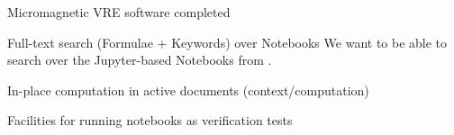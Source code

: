 \begin{workpackage}
\begin{wpdelivs}
    \begin{wpdeliv}[due=15,id=oommf-nb,dissem=PU,nature=DEM,lead=USO]
      {Micromagnetic VRE software completed}
    \end{wpdeliv}

    \begin{wpdeliv}[id=notebooksearch,due=18,nature=OTHER,dissem=PU,lead=JU]
      {Full-text search (Formulae + Keywords) over Notebooks}
      We want to be able to search over the Jupyter-based Notebooks from
      .
\end{wpdeliv}
    \begin{wpdeliv}[id=adcomp,due=18,nature=DEM,dissem=PU,lead=JU]
      {In-place computation in active documents (context/computation)}
    \end{wpdeliv}

  \begin{wpdeliv}[due=18,id=jupyter-test,dissem=PU,nature=OTHER,lead=SR]
      {Facilities for running notebooks as verification tests}
  \end{wpdeliv}


\end{wpdelivs}
\end{workpackage}
